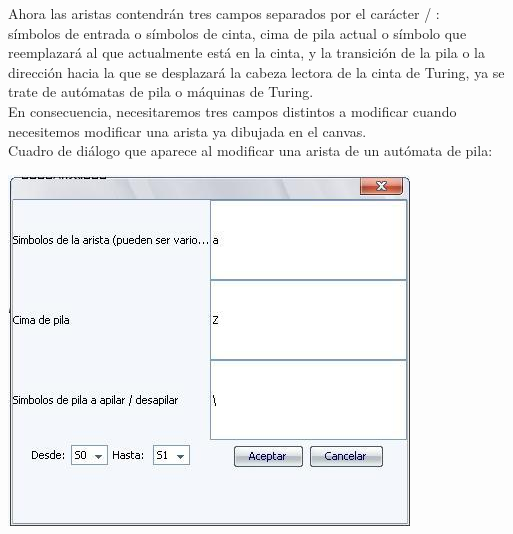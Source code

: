 \documentclass[12pt,a4paper,spanish]{book}
\begin{document}
\begin{itemize}
Ahora las aristas contendr\'an tres campos separados por el car\'acter / :\\ 
s\'imbolos de entrada o s\'imbolos de cinta, cima de pila actual o s\'imbolo que reemplazar\'a al que actualmente est\'a en la cinta, y la transici\'on de la pila o la direcci\'on hacia la que se desplazar\'a la cabeza lectora de la cinta de Turing, ya se trate de aut\'omatas de pila o m\'aquinas de Turing.\\ En consecuencia, necesitaremos tres campos distintos a modificar cuando necesitemos modificar una arista ya dibujada en el canvas.\\

Cuadro de di\'alogo que aparece al modificar una arista de un aut\'omata de pila:\\
\begin{center}
\includegraphics[width=\textwidth]{roci6.jpg}
\end{center}
\end{itemize}
\end{document}
